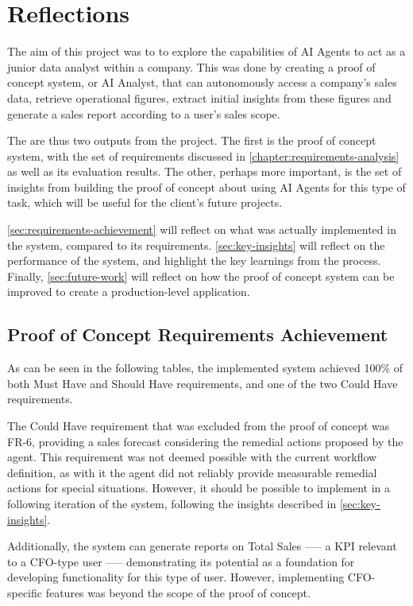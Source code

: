 \documentclass[a4paper]{report}
\begin{document}
\chapter{Reflections}
\label{chapter:reflections}

The aim of this project was to to explore the capabilities of AI Agents to act as a junior data analyst within a company. This was done by creating a proof of concept system, or AI Analyst, that can autonomously access a company's sales data, retrieve operational figures, extract initial insights from these figures and generate a sales report according to a user's sales scope.

The are thus two outputs from the project. The first is the proof of concept system, with the set of requirements discussed in \autoref{chapter:requirements-analysis} as well as its evaluation results. The other, perhaps more important, is the set of insights from building the proof of concept about using AI Agents for this type of task, which will be useful for the client's future projects.

\autoref{sec:requirements-achievement} will reflect on what was actually implemented in the system, compared to its requirements. \autoref{sec:key-insights} will reflect on the performance of the system, and highlight the key learnings from the process. Finally, \autoref{sec:future-work} will reflect on how the proof of concept system can be improved to create a production-level application.

\section{Proof of Concept Requirements Achievement}
\label{sec:requirements-achievement}

As can be seen in the following tables, the implemented system achieved 100\% of both Must Have and Should Have requirements, and one of the two Could Have requirements.

The Could Have requirement that was excluded from the proof of concept was FR-6, providing a sales forecast considering the remedial actions proposed by the agent. This requirement was not deemed possible with the current workflow definition, as with it the agent did not reliably provide measurable remedial actions for special situations. However, it should be possible to implement in a following iteration of the system, following the insights described in \autoref{sec:key-insights}.

Additionally, the system can generate reports on Total Sales —-- a KPI relevant to a CFO-type user —-- demonstrating its potential as a foundation for developing functionality for this type of user. However, implementing CFO-specific features was beyond the scope of the proof of concept.
\end{document}
